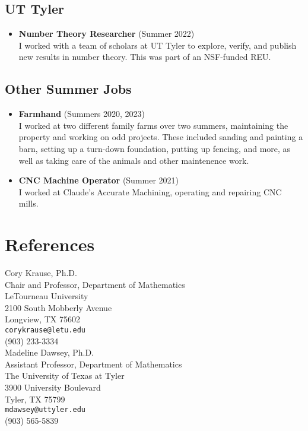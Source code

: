 \documentclass[a4paper, 11pt]{article}
\begin{document}
    \subsection*{UT Tyler}
    \begin{itemize}
        \item \textbf{Number Theory Researcher} (Summer 2022) \\
        I worked with a team of scholars at UT Tyler to explore, verify, and publish new results in number theory.
        This was part of an NSF-funded REU.
    \end{itemize}
    \subsection*{Other Summer Jobs}
    \begin{itemize}
        \item \textbf{Farmhand} (Summers 2020, 2023) \\
        I worked at two different family farms over two summers, maintaining the property and working on odd projects.
        These included sanding and painting a barn, setting up a turn-down foundation, putting up fencing, and more,
        as well as taking care of the animals and other maintenence work.
        \item \textbf{CNC Machine Operator} (Summer 2021) \\
        I worked at Claude's Accurate Machining, operating and repairing CNC mills.
    \end{itemize}

    \section*{References}\label{sec:references}
    \noindent
    Cory Krause, Ph.D. \\
    Chair and Professor, Department of Mathematics \\
    LeTourneau University \\
    2100 South Mobberly Avenue \\
    Longview, TX 75602 \\
    \texttt{corykrause@letu.edu} \\
    (903) 233-3334 \\

    \break
    \noindent
    Madeline Dawsey, Ph.D. \\
    Assistant Professor, Department of Mathematics \\
    The University of Texas at Tyler \\
    3900 University Boulevard \\
    Tyler, TX 75799 \\
    \texttt{mdawsey@uttyler.edu} \\
    (903) 565-5839 \\
\end{document}
